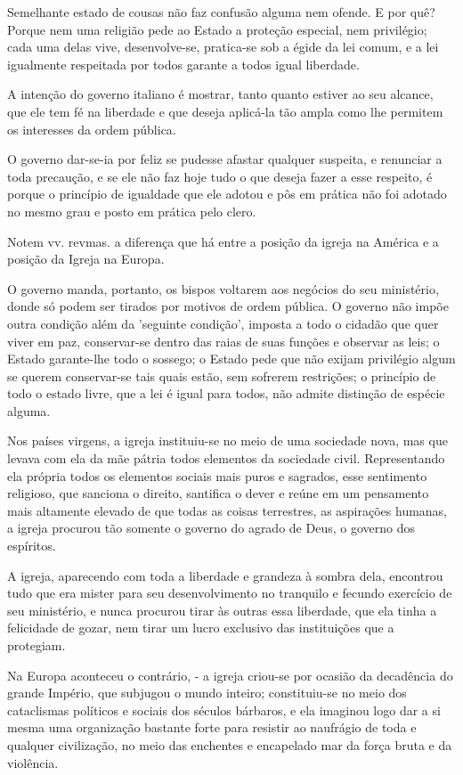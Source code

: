 Semelhante estado de cousas não faz confusão alguma nem ofende. E por
quê? Porque nem uma religião pede ao Estado a proteção especial, nem
privilégio; cada uma delas vive, desenvolve-se, pratica-se sob a égide
da lei comum, e a lei igualmente respeitada por todos garante a todos
igual liberdade.

A intenção do governo italiano é mostrar, tanto quanto estiver ao seu
alcance, que ele tem fé na liberdade e que deseja aplicá-la tão ampla
como lhe permitem os interesses da ordem pública.

O governo dar-se-ia por feliz se pudesse afastar qualquer suspeita, e
renunciar a toda precaução, e se ele não faz hoje tudo o que deseja
fazer a esse respeito, é porque o princípio de igualdade que ele adotou
e pôs em prática não foi adotado no mesmo grau e posto em prática pelo
clero.

Notem vv. revmas. a diferença que há entre a posição da igreja na
América e a posição da Igreja na Europa.

O governo manda, portanto, os bispos voltarem aos negócios do seu
ministério, donde só podem ser tirados por motivos de ordem pública. O
governo não impõe outra condição além da 'seguinte condição', imposta a
todo o cidadão que quer viver em paz, conservar-se dentro das raias de
suas funções e observar as leis; o Estado garante-lhe todo o sossego; o
Estado pede que não exijam privilégio algum se querem conservar-se tais
quais estão, sem sofrerem restrições; o princípio de todo o estado
livre, que a lei é igual para todos, não admite distinção de espécie
alguma.

Nos países virgens, a igreja instituiu-se no meio de uma sociedade nova,
mas que levava com ela da mãe pátria todos elementos da sociedade civil.
Representando ela própria todos os elementos sociais mais puros e
sagrados, esse sentimento religioso, que sanciona o direito, santifica o
dever e reúne em um pensamento mais altamente elevado de que todas as
coisas terrestres, as aspirações humanas, a igreja procurou tão somente
o governo do agrado de Deus, o governo dos espíritos.

A igreja, aparecendo com toda a liberdade e grandeza à sombra dela,
encontrou tudo que era mister para seu desenvolvimento no tranquilo e
fecundo exercício de seu ministério, e nunca procurou tirar às outras
essa liberdade, que ela tinha a felicidade de gozar, nem tirar um lucro
exclusivo das instituições que a protegiam.

Na Europa aconteceu o contrário, - a igreja criou-se por ocasião da
decadência do grande Império, que subjugou o mundo inteiro;
constituiu-se no meio dos cataclismas políticos e sociais dos séculos
bárbaros, e ela imaginou logo dar a si mesma uma organização bastante
forte para resistir ao naufrágio de toda e qualquer civilização, no meio
das enchentes e encapelado mar da força bruta e da violência.

